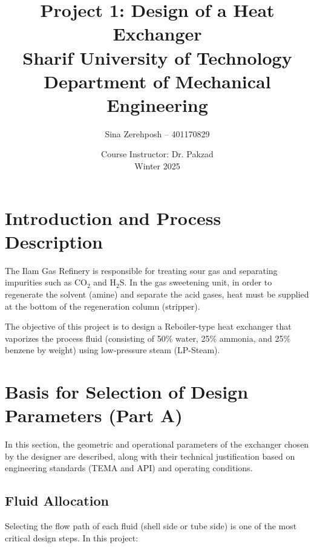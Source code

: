 \documentclass[12pt]{article}
\title{\textbf{Project 1: Design of a Heat Exchanger} \\[0.3em] \large Sharif University of Technology \\ Department of Mechanical Engineering}
\author{Sina Zerehposh -- 401170829}
\date{Course Instructor: Dr. Pakzad \\ Winter 2025}
\begin{document}
\maketitle

\section{Introduction and Process Description}

The Ilam Gas Refinery is responsible for treating sour gas and separating impurities such as CO$_2$ and H$_2$S. In the gas sweetening unit, in order to regenerate the solvent (amine) and separate the acid gases, heat must be supplied at the bottom of the regeneration column (stripper).

The objective of this project is to design a Reboiler-type heat exchanger that vaporizes the process fluid (consisting of 50\% water, 25\% ammonia, and 25\% benzene by weight) using low-pressure steam (LP-Steam).

\section{Basis for Selection of Design Parameters (Part A)}

In this section, the geometric and operational parameters of the exchanger chosen by the designer are described, along with their technical justification based on engineering standards (TEMA and API) and operating conditions.

\subsection{Fluid Allocation}

Selecting the flow path of each fluid (shell side or tube side) is one of the most critical design steps. In this project:
\end{document}
